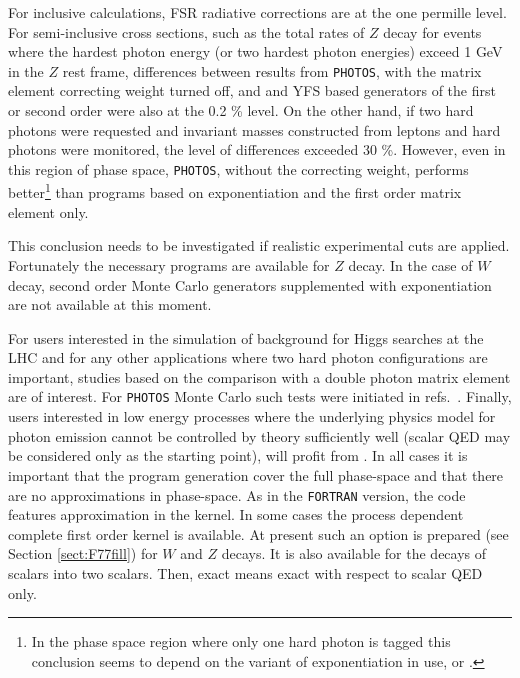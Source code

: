 \documentclass[]{Photos_interface_design}
\begin{document}
For inclusive calculations, FSR radiative corrections are at the one permille level.
For semi-inclusive cross sections, such as the total rates of $Z$ decay for events
where the hardest photon energy (or two hardest photon energies)   exceed 1 GeV in the $Z$ rest frame, differences
between results from {\tt PHOTOS}, with the matrix element correcting weight turned off, and
and YFS based generators of the first or second order were also 
at the 0.2 \% level. 
On the other hand, if two  hard photons were requested and invariant masses constructed from leptons
and hard photons were monitored,
 the level of differences exceeded 
 30 \%. However, even in this region of phase space, {\tt PHOTOS},  without the correcting
weight, performs better\footnote{In 
  the phase space region where only one hard photon is tagged this conclusion seems to depend
  on the variant of exponentiation in use, \cite{koralz4:1994} or \cite{kkcpc:1999}.
                                }
than programs based on exponentiation and the first order matrix element only. 

This conclusion needs to be investigated if   
realistic experimental 
cuts are applied. Fortunately the necessary programs are available for $Z$ decay.
In the case of $W$ decay, second order Monte Carlo generators supplemented with 
exponentiation are not available at this moment.
 
For users interested in the simulation of
background for Higgs searches at the LHC and for any other applications where 
two hard photon configurations are important, studies based on the comparison with 
a double photon matrix element are of 
interest. For {\tt PHOTOS} Monte Carlo such tests were initiated 
in refs.~\cite{Barberio:1993qi,RichterWas:1994ep,RichterWas:1993ta}.
Finally, users interested in low energy processes where the underlying physics model 
for photon emission cannot be controlled by theory sufficiently well
(scalar QED may 
be considered only as the starting point), will profit 
from \cite{Nanava:2006vv,Nanava:2009vg}. In all cases it is important that
the  program generation cover the full phase-space and that there are no 
approximations in phase-space. As in the {\tt FORTRAN} version, the code 
features approximation in the kernel. In some cases the process dependent 
complete first order 
kernel is available. At present such an option is prepared 
(see Section \ref{sect:F77fill}) for $W$ and $Z$ decays. It is also available for the  decays of scalars 
into two scalars. Then, exact means exact with respect to scalar QED only. 
\end{document}
